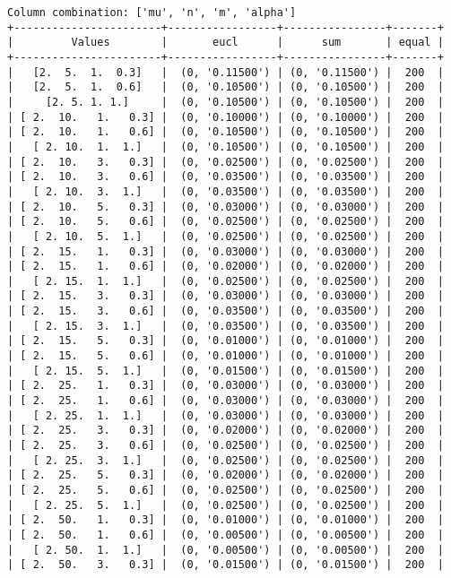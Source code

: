 \documentclass{article}
\begin{document}
\begin{verbatim}
Column combination: ['mu', 'n', 'm', 'alpha']
+-----------------------+-----------------+----------------+-------+
|         Values        |       eucl      |      sum       | equal |
+-----------------------+-----------------+----------------+-------+
|   [2.  5.  1.  0.3]   |  (0, '0.11500') | (0, '0.11500') |  200  |
|   [2.  5.  1.  0.6]   |  (0, '0.10500') | (0, '0.10500') |  200  |
|     [2. 5. 1. 1.]     |  (0, '0.10500') | (0, '0.10500') |  200  |
| [ 2.  10.   1.   0.3] |  (0, '0.10000') | (0, '0.10000') |  200  |
| [ 2.  10.   1.   0.6] |  (0, '0.10500') | (0, '0.10500') |  200  |
|   [ 2. 10.  1.  1.]   |  (0, '0.10500') | (0, '0.10500') |  200  |
| [ 2.  10.   3.   0.3] |  (0, '0.02500') | (0, '0.02500') |  200  |
| [ 2.  10.   3.   0.6] |  (0, '0.03500') | (0, '0.03500') |  200  |
|   [ 2. 10.  3.  1.]   |  (0, '0.03500') | (0, '0.03500') |  200  |
| [ 2.  10.   5.   0.3] |  (0, '0.03000') | (0, '0.03000') |  200  |
| [ 2.  10.   5.   0.6] |  (0, '0.02500') | (0, '0.02500') |  200  |
|   [ 2. 10.  5.  1.]   |  (0, '0.02500') | (0, '0.02500') |  200  |
| [ 2.  15.   1.   0.3] |  (0, '0.03000') | (0, '0.03000') |  200  |
| [ 2.  15.   1.   0.6] |  (0, '0.02000') | (0, '0.02000') |  200  |
|   [ 2. 15.  1.  1.]   |  (0, '0.02500') | (0, '0.02500') |  200  |
| [ 2.  15.   3.   0.3] |  (0, '0.03000') | (0, '0.03000') |  200  |
| [ 2.  15.   3.   0.6] |  (0, '0.03500') | (0, '0.03500') |  200  |
|   [ 2. 15.  3.  1.]   |  (0, '0.03500') | (0, '0.03500') |  200  |
| [ 2.  15.   5.   0.3] |  (0, '0.01000') | (0, '0.01000') |  200  |
| [ 2.  15.   5.   0.6] |  (0, '0.01000') | (0, '0.01000') |  200  |
|   [ 2. 15.  5.  1.]   |  (0, '0.01500') | (0, '0.01500') |  200  |
| [ 2.  25.   1.   0.3] |  (0, '0.03000') | (0, '0.03000') |  200  |
| [ 2.  25.   1.   0.6] |  (0, '0.03000') | (0, '0.03000') |  200  |
|   [ 2. 25.  1.  1.]   |  (0, '0.03000') | (0, '0.03000') |  200  |
| [ 2.  25.   3.   0.3] |  (0, '0.02000') | (0, '0.02000') |  200  |
| [ 2.  25.   3.   0.6] |  (0, '0.02500') | (0, '0.02500') |  200  |
|   [ 2. 25.  3.  1.]   |  (0, '0.02500') | (0, '0.02500') |  200  |
| [ 2.  25.   5.   0.3] |  (0, '0.02000') | (0, '0.02000') |  200  |
| [ 2.  25.   5.   0.6] |  (0, '0.02500') | (0, '0.02500') |  200  |
|   [ 2. 25.  5.  1.]   |  (0, '0.02500') | (0, '0.02500') |  200  |
| [ 2.  50.   1.   0.3] |  (0, '0.01000') | (0, '0.01000') |  200  |
| [ 2.  50.   1.   0.6] |  (0, '0.00500') | (0, '0.00500') |  200  |
|   [ 2. 50.  1.  1.]   |  (0, '0.00500') | (0, '0.00500') |  200  |
| [ 2.  50.   3.   0.3] |  (0, '0.01500') | (0, '0.01500') |  200  |

\end{verbatim}
\end{document}
